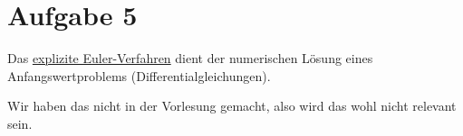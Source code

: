 \section*{Aufgabe 5}

Das \href{https://de.wikipedia.org/wiki/Explizites_Euler-Verfahren}{explizite Euler-Verfahren}
dient der numerischen Lösung eines Anfangswertproblems (Differentialgleichungen).

Wir haben das nicht in der Vorlesung gemacht, also wird das wohl nicht
relevant sein.
